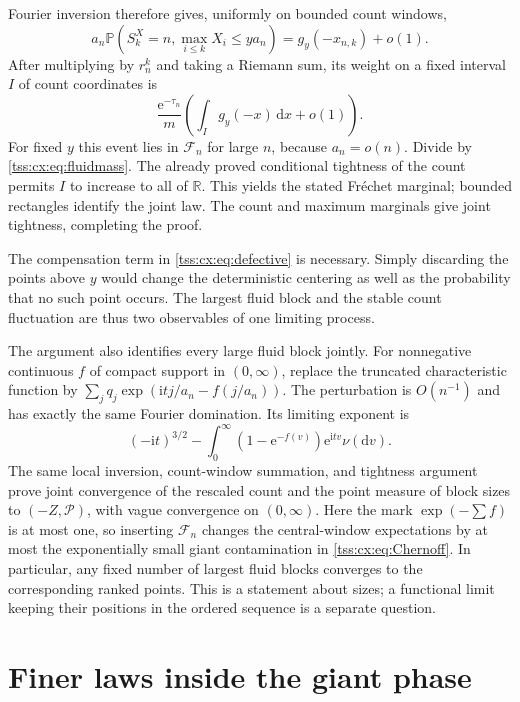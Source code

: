 \documentclass[11pt]{article}
\theoremstyle{remark}\newtheorem{remark}[theorem]{Remark}
\theoremstyle{definition}\newtheorem{definition}[theorem]{Definition}
\newcommand{\ii}{\mathrm i}
\newcommand{\dd}{\mathrm d}
\newcommand{\e}{\mathrm e}
\newcommand{\Prob}{\mathbb P}
\newcommand{\R}{\mathbb R}
\newcommand{\Fev}{\mathcal F_n}
\begin{document}
Fourier inversion therefore gives, uniformly on bounded count windows,
\[
 a_n\Prob(S_k^X=n,\max_{i\le k}X_i\le ya_n)
     =g_y(-x_{n,k})+o(1).
\]
After multiplying by $r_n^k$ and taking a Riemann sum, its weight
on a fixed interval $I$ of count coordinates is
\[
 \frac{\e^{-\tau_n}}m
       \left(\int_Ig_y(-x)\,\dd x+o(1)\right).
\]
For fixed $y$ this event lies in $\Fev$ for large $n$, because
$a_n=o(n)$. Divide by \eqref{tss:cx:eq:fluidmass}. The already proved
conditional tightness of the count permits $I$ to increase to all
of $\R$. This yields the stated Fr\'echet marginal; bounded
rectangles identify the joint law. The count and maximum marginals
give joint tightness, completing the proof.

The compensation term in \eqref{tss:cx:eq:defective} is necessary. Simply
discarding the points above $y$ would change the deterministic
centering as well as the probability that no such point occurs.
The largest fluid block and the stable count fluctuation are thus
two observables of one limiting process.

The argument also identifies every large fluid block jointly. For
nonnegative continuous $f$ of compact support in $(0,\infty)$,
replace the truncated characteristic function by
$\sum_jq_j\exp(\ii tj/a_n-f(j/a_n))$. The perturbation is $O(n^{-1})$
and has exactly the same Fourier domination. Its limiting exponent is
\[
 (-\ii t)^{3/2}
 -\int_0^\infty(1-\e^{-f(v)})\e^{\ii tv}\nu(\dd v).
\]
The same local inversion, count-window summation, and tightness
argument prove joint convergence of the rescaled count and the
point measure of block sizes to $(-Z,\mathcal P)$, with vague
convergence on $(0,\infty)$. Here the mark $\exp(-\sum f)$ is at most
one, so inserting $\Fev$ changes the central-window expectations
by at most the exponentially small giant contamination in
\eqref{tss:cx:eq:Chernoff}. In particular, any fixed number of
largest fluid blocks converges to the corresponding ranked points.
This is a statement about sizes; a functional limit keeping their
positions in the ordered sequence is a separate question.

\section{Finer laws inside the giant phase}
\label{tss:cx:sec:finer}
\end{document}
